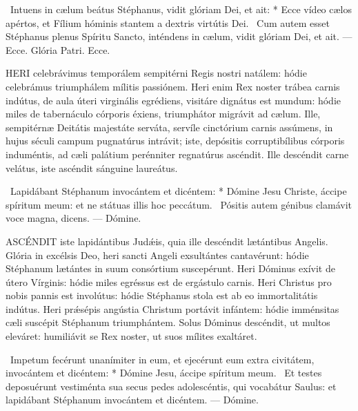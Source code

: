 \R\ Intuens in cælum beátus Stéphanus, vidit glóriam Dei, et ait: * Ecce vídeo cælos apértos, et Fílium hóminis stantem a dextris virtútis Dei. \V\ Cum autem esset Stéphanus plenus Spíritu Sancto, inténdens in cælum, vidit glóriam Dei, et ait. --- Ecce. Glória Patri. Ecce.





\lettrine[lines=2]{H}{ERI} celebrávimus temporálem sempitérni Regis nostri natálem: hódie celebrámus triumphálem mílitis passiónem. Heri enim Rex noster trábea carnis indútus, de aula úteri virginális egrédiens, visitáre dignátus est mundum: hódie miles de tabernáculo córporis éxiens, triumphátor migrávit ad cælum. Ille, sempitérnæ Deitátis majestáte serváta, servíle cinctórium carnis assúmens, in hujus séculi campum pugnatúrus intrávit; iste, depósitis corruptibílibus córporis induméntis, ad cæli palátium perénniter regnatúrus ascéndit. Ille descéndit carne velátus, iste ascéndit sánguine laureátus.

\R\ Lapidábant Stéphanum invocántem et dicéntem: * Dómine Jesu Christe, áccipe spíritum meum: et ne státuas illis hoc peccátum. \V\ Pósitis autem génibus clamávit voce magna, dicens. --- Dómine.


\lettrine[lines=2]{A}{SCÉNDIT} iste lapidántibus Judǽis, quia ille descéndit lætántibus Angelis. Glória in excélsis Deo, heri sancti Angeli exsultántes cantavérunt: hódie Stéphanum lætántes in suum consórtium suscepérunt. Heri Dóminus exívit de útero Vírginis: hódie miles egréssus est de ergástulo carnis. Heri Christus pro nobis pannis est involútus: hódie Stéphanus stola est ab eo immortalitátis indútus. Heri prǽsépis angústia Christum portávit infántem: hódie imménsitas cæli suscépit Stéphanum triumphántem. Solus Dóminus descéndit, ut multos eleváret: humiliávit se Rex noster, ut suos mílites exaltáret.

\R\ Impetum fecérunt unanímiter in eum, et ejecérunt eum extra civitátem, invocántem et dicéntem: * Dómine Jesu, áccipe spíritum meum. \V\ Et testes deposuérunt vestiménta sua secus pedes adolescéntis, qui vocabátur Saulus: et lapidábant Stéphanum invocántem et dicéntem. --- Dómine.


